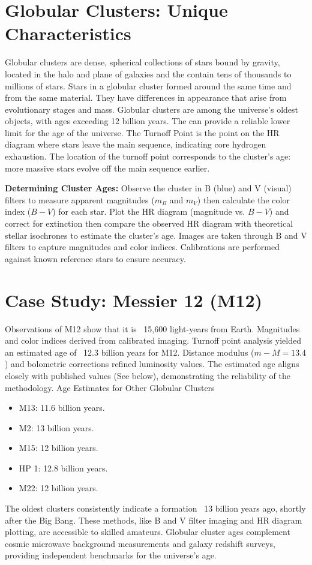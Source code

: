 \documentclass[12pt]{article}
\begin{document}
\section{Globular Clusters: Unique Characteristics}
    Globular clusters are dense, spherical collections of stars bound by gravity, located in the halo and plane of galaxies and the contain tens of thousands to millions of stars. Stars in a globular cluster formed around the same time and from the same material. They have differences in appearance that arise from evolutionary stages and mass. Globular clusters are among the universe's oldest objects, with ages exceeding 12 billion years. The can provide a reliable lower limit for the age of the universe. The Turnoff Point is the point on the HR diagram where stars leave the main sequence, indicating core hydrogen exhaustion. The location of the turnoff point corresponds to the cluster's age: more massive stars evolve off the main sequence earlier.


\textbf{Determining Cluster Ages:}
    Observe the cluster in B (blue) and V (visual) filters to measure apparent magnitudes (\( m_B \) and \( m_V \)) then calculate the color index (\( B-V \)) for each star. Plot the HR diagram (magnitude vs. \( B-V \)) and correct for extinction then compare the observed HR diagram with theoretical stellar isochrones to estimate the cluster's age. Images are taken through B and V filters to capture magnitudes and color indices. Calibrations are performed against known reference stars to ensure accuracy.
 
\section{Case Study: Messier 12 (M12)}
    Observations of M12 show that it is ~15,600 light-years from Earth. Magnitudes and color indices derived from calibrated imaging. Turnoff point analysis yielded an estimated age of ~12.3 billion years for M12.
    Distance modulus (\( m - M = 13.4 \)) and bolometric corrections refined luminosity values. The estimated age aligns closely with published values (See below), demonstrating the reliability of the methodology.
    \newline Age Estimates for Other Globular Clusters
    \begin{itemize}
        \item M13: 11.6 billion years.
        \item M2: 13 billion years.
        \item M15: 12 billion years.
        \item HP 1: 12.8 billion years.
        \item M22: 12 billion years.
    \end{itemize}
    The oldest clusters consistently indicate a formation ~13 billion years ago, shortly after the Big Bang. These methods, like B and V filter imaging and HR diagram plotting, are accessible to skilled amateurs. Globular cluster ages complement cosmic microwave background measurements and galaxy redshift surveys, providing independent benchmarks for the universe's age.
\end{document}
